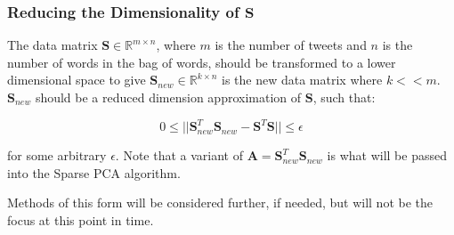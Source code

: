 \documentclass[11pt,a4paper]{article}
\begin{document}
\subsubsection{Reducing the Dimensionality of $\mathbf{S}$}
The data matrix $\mathbf{S} \in \mathbb{R}^{m \times n}$, where $m$ is the number of tweets and $n$ is the number of words in the bag of words, should be transformed to a lower dimensional space to give $\mathbf{S}_{new} \in \mathbb{R}^{k \times n}$ is the new data matrix where $k << m$. $\mathbf{S}_{new}$ should be a reduced dimension approximation of  $\mathbf{S}$, such that:


\begin{equation*}
0 \le ||\mathbf{S}_{new}^T\mathbf{S}_{new} - \mathbf{S}^T\mathbf{S}|| \le \epsilon 
\end{equation*}

for some arbitrary $\epsilon$. Note that a variant of $\mathbf{A} = \mathbf{S}_{new}^T\mathbf{S}_{new}$ is what will be passed into the Sparse PCA algorithm. 

Methods of this form will be considered further, if needed, but will not be the focus at this point in time.




\end{document}
